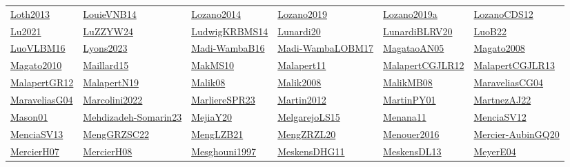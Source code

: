 \begin{longtable}{*{6}{l}}
\hyperref[detail:Loth2013]{Loth2013} & \hyperref[detail:LouieVNB14]{LouieVNB14} & \hyperref[detail:Lozano2014]{Lozano2014} & \hyperref[detail:Lozano2019]{Lozano2019} & \hyperref[detail:Lozano2019a]{Lozano2019a} & \hyperref[detail:LozanoCDS12]{LozanoCDS12}\\ 
\hyperref[detail:Lu2021]{Lu2021} & \hyperref[detail:LuZZYW24]{LuZZYW24} & \hyperref[detail:LudwigKRBMS14]{LudwigKRBMS14} & \hyperref[detail:Lunardi20]{Lunardi20} & \hyperref[detail:LunardiBLRV20]{LunardiBLRV20} & \hyperref[detail:LuoB22]{LuoB22}\\ 
\hyperref[detail:LuoVLBM16]{LuoVLBM16} & \hyperref[detail:Lyons2023]{Lyons2023} & \hyperref[detail:Madi-WambaB16]{Madi-WambaB16} & \hyperref[detail:Madi-WambaLOBM17]{Madi-WambaLOBM17} & \hyperref[detail:MagataoAN05]{MagataoAN05} & \hyperref[detail:Magato2008]{Magato2008}\\ 
\hyperref[detail:Magato2010]{Magato2010} & \hyperref[detail:Maillard15]{Maillard15} & \hyperref[detail:MakMS10]{MakMS10} & \hyperref[detail:Malapert11]{Malapert11} & \hyperref[detail:MalapertCGJLR12]{MalapertCGJLR12} & \hyperref[detail:MalapertCGJLR13]{MalapertCGJLR13}\\ 
\hyperref[detail:MalapertGR12]{MalapertGR12} & \hyperref[detail:MalapertN19]{MalapertN19} & \hyperref[detail:Malik08]{Malik08} & \hyperref[detail:Malik2008]{Malik2008} & \hyperref[detail:MalikMB08]{MalikMB08} & \hyperref[detail:MaraveliasCG04]{MaraveliasCG04}\\ 
\hyperref[detail:MaraveliasG04]{MaraveliasG04} & \hyperref[detail:Marcolini2022]{Marcolini2022} & \hyperref[detail:MarliereSPR23]{MarliereSPR23} & \hyperref[detail:Martin2012]{Martin2012} & \hyperref[detail:MartinPY01]{MartinPY01} & \hyperref[detail:MartnezAJ22]{MartnezAJ22}\\ 
\hyperref[detail:Mason01]{Mason01} & \hyperref[detail:Mehdizadeh-Somarin23]{Mehdizadeh-Somarin23} & \hyperref[detail:MejiaY20]{MejiaY20} & \hyperref[detail:MelgarejoLS15]{MelgarejoLS15} & \hyperref[detail:Menana11]{Menana11} & \hyperref[detail:MenciaSV12]{MenciaSV12}\\ 
\hyperref[detail:MenciaSV13]{MenciaSV13} & \hyperref[detail:MengGRZSC22]{MengGRZSC22} & \hyperref[detail:MengLZB21]{MengLZB21} & \hyperref[detail:MengZRZL20]{MengZRZL20} & \hyperref[detail:Menouer2016]{Menouer2016} & \hyperref[detail:Mercier-AubinGQ20]{Mercier-AubinGQ20}\\ 
\hyperref[detail:MercierH07]{MercierH07} & \hyperref[detail:MercierH08]{MercierH08} & \hyperref[detail:Mesghouni1997]{Mesghouni1997} & \hyperref[detail:MeskensDHG11]{MeskensDHG11} & \hyperref[detail:MeskensDL13]{MeskensDL13} & \hyperref[detail:MeyerE04]{MeyerE04}\\ 

\end{longtable}

